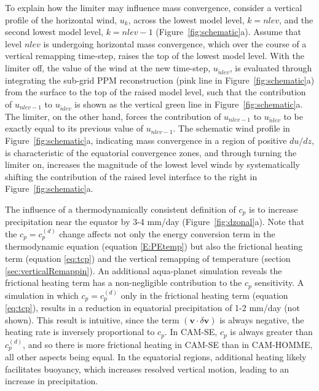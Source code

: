\documentclass{agujournal}
\begin{document}
To explain how the limiter may influence mass convergence, consider a vertical profile of the horizontal wind, $u_k$, across the lowest model level, $k=nlev$, and the second lowest model level, $k=nlev-1$ (Figure~\ref{fig:schematic}a). Assume that level $nlev$ is undergoing horizontal mass convergence, which over the course of a vertical remapping time-step, raises the top of the lowest model level. With the limiter off, the value of the wind at the new time-step, $u_{\tilde nlev}$, is evaluated through integrating the sub-grid PPM reconstruction (pink line in Figure~\ref{fig:schematic}a) from the surface to the top of the raised model level, such that the contribution of $u_{nlev-1}$ to $u_{\tilde nlev}$ is shown as the vertical green line in Figure~\ref{fig:schematic}a. The limiter, on the other hand, forces the contribution of $u_{nlev-1}$ to $u_{\tilde nlev}$ to be exactly equal to its previous value of $u_{nlev-1}$. The schematic wind profile in Figure~\ref{fig:schematic}a, indicating mass convergence in a region of positive $du/dz$, is characteristic of the equatorial convergence zones, and through turning the limiter on, increases the magnitude of the lowest level winds by systematically shifting the contribution of the raised level interface to the right in Figure~\ref{fig:schematic}a.

The influence of a thermodynamically consistent definition of $c_p$ is to increase precipitation near the equator by 3-4 mm/day (Figure~\ref{fig:dzonal}a). Note that the $c_p=c_p^{(d)}$ change affects not only the energy conversion term in the thermodynamic equation (equation \eqref{E:PEtemp}) but also the frictional heating term (equation \eqref{eq:tcp}) and the vertical remapping of temperature (section \ref{sec:verticalRemappin}). An additional aqua-planet simulation reveals the frictional heating term has a non-negligible contribution to the $c_p$ sensitivity. A simulation in which $c_p = c_p^{(d)}$ only in the frictional heating term (equation \eqref{eq:tcp}), results in a reduction in equatorial precipitation of 1-2 mm/day (not shown). This result is intuitive, since the term $\left(\mathbf{v}\cdot \delta \mathbf{v}\right)$ is always negative, the heating rate is inversely proportional to $c_p$. In CAM-SE, $c_p$ is always greater than $c_p^{(d)}$, and so there is more frictional heating in CAM-SE than in CAM-HOMME, all other aspects being equal. In the equatorial regions, additional heating likely facilitates buoyancy, which increases resolved vertical motion, leading to an increase in precipitation. 
\end{document}
